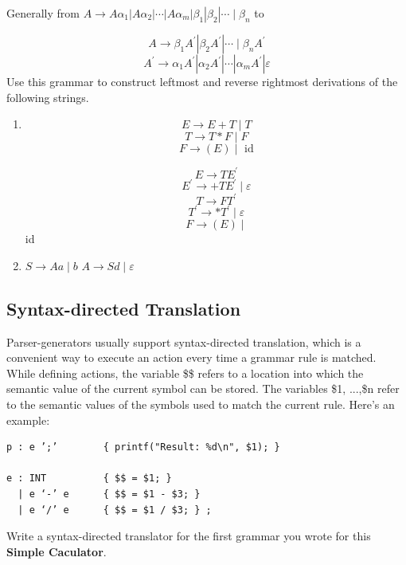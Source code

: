 \documentclass[a4paper]{exam}
\begin{document}
Generally from $A \rightarrow A \alpha_{1}\left|A \alpha_{2}\right| \cdots\left|A \alpha_{m}\right| \beta_{1}\left|\beta_{2}\right| \cdots \mid \beta_{n}$ to 

$$A \rightarrow \beta_{1} A^{\prime}\left|\beta_{2} A^{\prime}\right| \cdots \mid \beta_{n} A^{\prime}$$
$$A^{\prime} \rightarrow \alpha_{1} A^{\prime}\left|\alpha_{2} A^{\prime}\right| \cdots\left|\alpha_{m} A^{\prime}\right| \varepsilon$$Use this grammar to construct leftmost and reverse rightmost derivations of the following strings.
\begin{enumerate}
\item {}

$$E \rightarrow E+T \mid T$$
$$T \rightarrow T * F \mid F$$
$$F \rightarrow(E) \mid\text{ id}$$ 

\begin{solution}
$$E \rightarrow T E^{\prime}$$
$$E^{\prime} \rightarrow+T E^{\prime} \mid \varepsilon$$
$$T \rightarrow F T^{\prime}$$
$$T^{\prime} \rightarrow * T^{\prime} \mid \varepsilon$$
$$F \rightarrow(E) \mid$$ id
\end{solution}
\item {}
$S \rightarrow A a \mid b$
$A \rightarrow S d \mid \varepsilon$
\end{enumerate}


\subsection{Syntax-directed Translation}
Parser-generators usually support syntax-directed translation, which is a convenient way  to  execute  an  action  every  time  a  grammar  rule  is  matched.   While  defining actions,  the  variable \$\$ refers  to  a  location  into  which  the  semantic  value  of  the current symbol can be stored.  The variables \$1, ...,\$n refer to the semantic values of the symbols used to match the current rule.  Here’s an example:
\begin{verbatim}
p : e ’;’        { printf("Result: %d\n", $1); }

e : INT          { $$ = $1; }
  | e ‘-’ e      { $$ = $1 - $3; }
  | e ‘/’ e      { $$ = $1 / $3; } ;
\end{verbatim}

Write a syntax-directed translator for the first grammar you wrote for this \textbf{Simple Caculator}.
\end{document}
